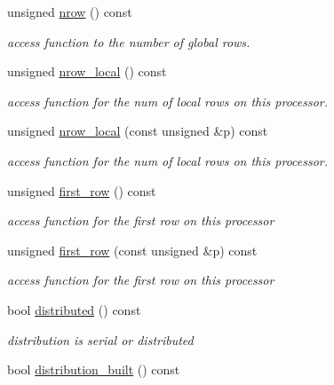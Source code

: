 \begin{DoxyCompactItemize}
unsigned \hyperlink{classoomph_1_1DistributableLinearAlgebraObject_a7569556f14fd68b28508920e89bd5eee}{nrow} () const
\begin{DoxyCompactList}\small\item\em access function to the number of global rows. \end{DoxyCompactList}\item 
unsigned \hyperlink{classoomph_1_1DistributableLinearAlgebraObject_a9bd7e1d242c69a28da85a804a7717fce}{nrow\+\_\+local} () const
\begin{DoxyCompactList}\small\item\em access function for the num of local rows on this processor. \end{DoxyCompactList}\item 
unsigned \hyperlink{classoomph_1_1DistributableLinearAlgebraObject_a21e966b025edec79067b41d7f1f25220}{nrow\+\_\+local} (const unsigned \&p) const
\begin{DoxyCompactList}\small\item\em access function for the num of local rows on this processor. \end{DoxyCompactList}\item 
unsigned \hyperlink{classoomph_1_1DistributableLinearAlgebraObject_ab00a3919b8634c698749f14a4d92947d}{first\+\_\+row} () const
\begin{DoxyCompactList}\small\item\em access function for the first row on this processor \end{DoxyCompactList}\item 
unsigned \hyperlink{classoomph_1_1DistributableLinearAlgebraObject_a4266c1d18d8e102bad3f4aec26c9b7cf}{first\+\_\+row} (const unsigned \&p) const
\begin{DoxyCompactList}\small\item\em access function for the first row on this processor \end{DoxyCompactList}\item 
bool \hyperlink{classoomph_1_1DistributableLinearAlgebraObject_a5505731e7e73d7e4251c67c7adec6bf5}{distributed} () const
\begin{DoxyCompactList}\small\item\em distribution is serial or distributed \end{DoxyCompactList}\item 
bool \hyperlink{classoomph_1_1DistributableLinearAlgebraObject_a8c35baa65e335043f62954c92c090a5a}{distribution\+\_\+built} () const
\item 

\end{DoxyCompactItemize}
